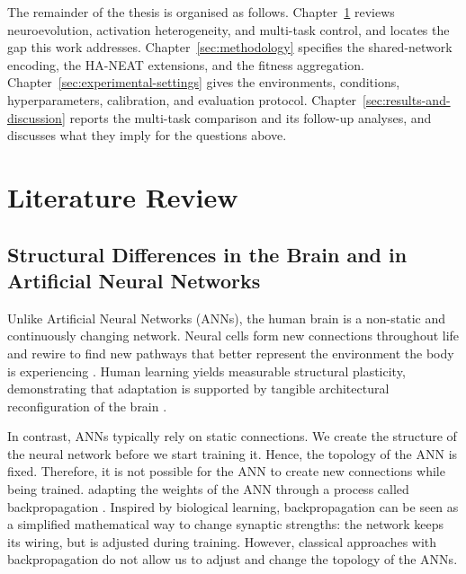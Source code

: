 The remainder of the thesis is organised as follows.
Chapter~\ref{sec:literature-review} reviews neuroevolution, activation heterogeneity, and multi-task control, and locates the gap this work addresses.
Chapter~\ref{sec:methodology} specifies the shared-network encoding, the HA-NEAT extensions, and the fitness aggregation.
Chapter~\ref{sec:experimental-settings} gives the environments, conditions, hyperparameters, calibration, and evaluation protocol.
Chapter~\ref{sec:results-and-discussion} reports the multi-task comparison and its follow-up analyses, and discusses what they imply for the questions above.

\newpage
\chapter{Literature Review}
\label{sec:literature-review}


\section{Structural Differences in the Brain and in Artificial Neural Networks}
\label{subsec:structural-differences-in-the-brain-and}


Unlike Artificial Neural Networks (ANNs), the human brain is a non-static and continuously changing network.
Neural cells form new connections throughout life and rewire to find new pathways that better represent the environment the body is experiencing \parencite{pascual-leone_plastic_2005,holtmaat_experience-dependent_2009}.
Human learning yields measurable structural plasticity, demonstrating that adaptation is supported by tangible architectural reconfiguration of the brain \parencite{draganski_changes_2004}.

In contrast, ANNs typically rely on static connections.
We create the structure of the neural network before we start training it.
Hence, the topology of the ANN is fixed.
Therefore, it is not possible for the ANN to create new connections while being trained.
 adapting the weights of the ANN through a process called backpropagation \parencite{rumelhart_learning_1986}.
Inspired by biological learning, backpropagation can be seen as a simplified mathematical way to change synaptic strengths: the network keeps its wiring, but  is adjusted during training.
However, classical approaches with backpropagation do not allow us to adjust and change the topology of the ANNs.


